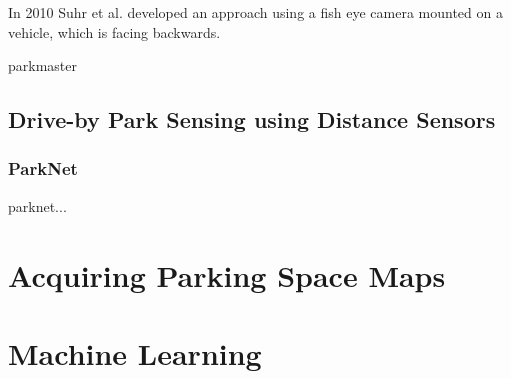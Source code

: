 In 2010 Suhr et al. \cite{Suhr2010} developed an approach using a fish eye camera mounted on a vehicle, which is facing backwards.
 
parkmaster \cite{Grassi:2017:PIE:3132211.3134452}



\subsection{Drive-by Park Sensing using Distance Sensors}
\label{sec:related_driveby_park_sensing_distance}

\subsubsection{ParkNet}
\label{sec:parknet}

parknet... \cite{Mathur:2010:PDS:1814433.1814448}



\section{Acquiring Parking Space Maps}



\section{Machine Learning}

